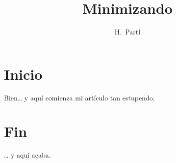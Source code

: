 \documentclass[a4paper,11pt]{article}
\author{H.~Partl}
\title{Minimizando}
\begin{document}
\maketitle \tableofcontents
\section{Inicio}
Bien\ldots{} y aqu\'i comienza
mi art\'iculo tan estupendo.
\section{Fin}
\ldots{} y aqu\'i acaba.
\end{document}
